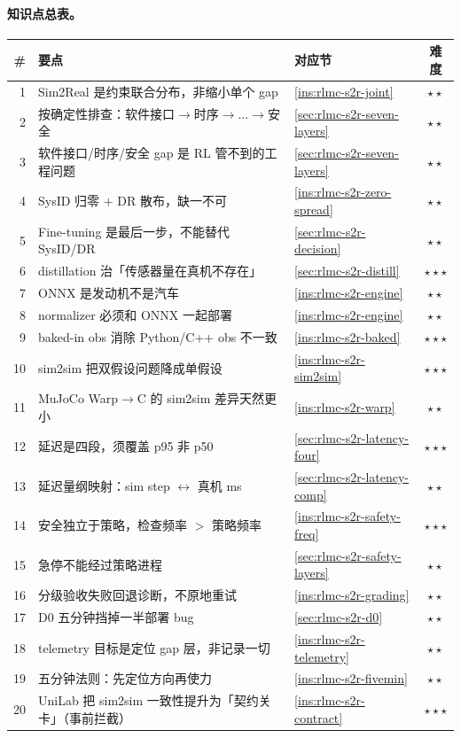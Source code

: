 \paragraph{知识点总表。}
\begin{center}
\small
\begin{tabular}{@{}rp{6.8cm}lc@{}}
\toprule
\# & 要点 & 对应节 & 难度 \\
\midrule
1 & Sim2Real 是约束联合分布，非缩小单个 gap & \cref{ins:rlmc-s2r-joint} & $\star\star$ \\
2 & 按确定性排查：软件接口$\to$时序$\to\dots\to$安全 & \cref{sec:rlmc-s2r-seven-layers} & $\star\star$ \\
3 & 软件接口/时序/安全 gap 是 RL 管不到的工程问题 & \cref{sec:rlmc-s2r-seven-layers} & $\star\star$ \\
4 & SysID 归零 $+$ DR 散布，缺一不可 & \cref{ins:rlmc-s2r-zero-spread} & $\star\star$ \\
5 & Fine-tuning 是最后一步，不能替代 SysID/DR & \cref{sec:rlmc-s2r-decision} & $\star\star$ \\
6 & distillation 治「传感器量在真机不存在」 & \cref{sec:rlmc-s2r-distill} & $\star\star\star$ \\
7 & ONNX 是发动机不是汽车 & \cref{ins:rlmc-s2r-engine} & $\star\star$ \\
8 & normalizer 必须和 ONNX 一起部署 & \cref{ins:rlmc-s2r-engine} & $\star\star$ \\
9 & baked-in obs 消除 Python/C++ obs 不一致 & \cref{ins:rlmc-s2r-baked} & $\star\star\star$ \\
10 & sim2sim 把双假设问题降成单假设 & \cref{ins:rlmc-s2r-sim2sim} & $\star\star\star$ \\
11 & MuJoCo Warp$\to$C 的 sim2sim 差异天然更小 & \cref{ins:rlmc-s2r-warp} & $\star\star$ \\
12 & 延迟是四段，须覆盖 p95 非 p50 & \cref{sec:rlmc-s2r-latency-four} & $\star\star\star$ \\
13 & 延迟量纲映射：sim step $\leftrightarrow$ 真机 ms & \cref{sec:rlmc-s2r-latency-comp} & $\star\star$ \\
14 & 安全独立于策略，检查频率 $>$ 策略频率 & \cref{ins:rlmc-s2r-safety-freq} & $\star\star\star$ \\
15 & 急停不能经过策略进程 & \cref{sec:rlmc-s2r-safety-layers} & $\star\star$ \\
16 & 分级验收失败回退诊断，不原地重试 & \cref{ins:rlmc-s2r-grading} & $\star\star$ \\
17 & D0 五分钟挡掉一半部署 bug & \cref{sec:rlmc-s2r-d0} & $\star\star$ \\
18 & telemetry 目标是定位 gap 层，非记录一切 & \cref{ins:rlmc-s2r-telemetry} & $\star\star$ \\
19 & 五分钟法则：先定位方向再使力 & \cref{ins:rlmc-s2r-fivemin} & $\star\star$ \\
20 & UniLab 把 sim2sim 一致性提升为「契约关卡」（事前拦截） & \cref{ins:rlmc-s2r-contract} & $\star\star\star$ \\
\bottomrule
\end{tabular}
\end{center}

